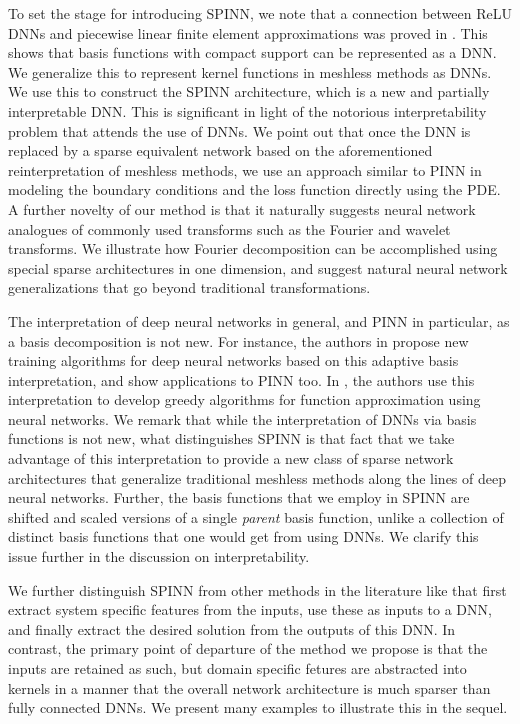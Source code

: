\documentclass[12pt]{article}
\newcommand{\rr}[1]{#1}
\newcommand{\rR}[1]{#1}
\begin{document}
To set the stage for introducing SPINN, we note that a connection between ReLU DNNs and piecewise linear finite element approximations was proved in \cite{HLXZ2020}. This shows that basis functions with compact support can be represented as a DNN. We generalize this to represent kernel functions in meshless methods as DNNs. We use this to construct the SPINN architecture, which is a new and \rR{partially} interpretable DNN. This is significant in light of the notorious interpretability problem that attends the use of DNNs. We point out that once the DNN is replaced by a sparse equivalent network based on the aforementioned reinterpretation of meshless methods, we use an approach similar to PINN in modeling the boundary conditions and the loss function directly using the PDE. A further novelty of our method is that it naturally suggests neural network analogues of commonly used transforms such as the Fourier and wavelet transforms. We illustrate how Fourier decomposition can be accomplished using special sparse architectures in one dimension, and suggest natural neural network generalizations that go beyond traditional transformations.

\rr{The interpretation of deep neural networks in general, and PINN in particular, as a basis decomposition is not new. For instance, the authors in \cite{CGPPT20} propose new training algorithms for deep neural networks based on this adaptive basis interpretation, and show applications to PINN too. In \cite{FO19}, the authors use this interpretation to develop greedy algorithms for function approximation using neural networks. We remark that while the interpretation of DNNs via basis functions is not new, what distinguishes SPINN is that fact that we take advantage of this interpretation to provide a new class of sparse network architectures that generalize traditional meshless methods along the lines of deep neural networks. Further, the basis functions that we employ in SPINN are shifted and scaled versions of a single \emph{parent} basis function, unlike a collection of distinct basis functions that one would get from using DNNs. We clarify this issue further in the discussion on interpretability.}

\rr{We further distinguish SPINN from other methods in the literature like \cite{WANG2021113938, YRK20, LPYWVJ21} that first extract system specific features from the inputs, use these as inputs to a DNN, and finally extract the desired solution from the outputs of this DNN. In contrast, the primary point of departure of the method we propose is that the inputs are retained as such, but domain specific fetures are abstracted into kernels in a manner that the overall network architecture is much sparser than fully connected DNNs. We present many examples to illustrate this in the sequel.}
\end{document}
